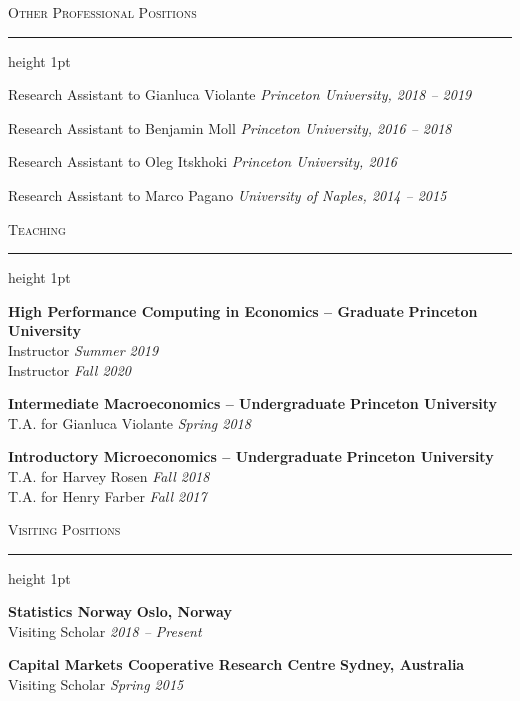 \documentclass{resume} %
\renewenvironment{rSection}[1]{
\sectionskip
\Large{\textsc{#1}}
\normalsize
\sectionlineskip
\hrule height 1pt
\begin{list}{}{
\setlength{\leftmargin}{1.5em}
}
\item[]
}{
\end{list}
}
\begin{document}

\begin{rSection}{Other Professional Positions}

{Research Assistant to Gianluca Violante} \hfill {\em Princeton University, 2018 -- 2019}

{Research Assistant to Benjamin Moll} \hfill {\em Princeton University, 2016 -- 2018}

{Research Assistant to Oleg Itskhoki} \hfill {\em Princeton University, 2016}

{Research Assistant to Marco Pagano} \hfill {\em University of Naples, 2014 -- 2015}

\end{rSection}


\begin{rSection}{Teaching}

{\bf High Performance Computing in Economics -- Graduate} \hfill {\bf Princeton University} \\
{Instructor} \hfill {\em Summer 2019} \\
{Instructor} \hfill {\em Fall 2020}

{\bf Intermediate Macroeconomics -- Undergraduate} \hfill {\bf Princeton University} \\
{T.A. for Gianluca Violante} \hfill {\em Spring 2018} 

{\bf Introductory Microeconomics -- Undergraduate} \hfill {\bf Princeton University} \\
{T.A. for Harvey Rosen} \hfill {\em Fall 2018} \\
{T.A. for Henry Farber} \hfill {\em Fall 2017} 

\end{rSection}


\begin{rSection}{Visiting Positions}

{\bf Statistics Norway} \hfill {\bf Oslo, Norway}
\\ Visiting Scholar \hfill {\em 2018 -- Present}

{\bf Capital Markets Cooperative Research Centre} \hfill {\bf Sydney, Australia}
\\ Visiting Scholar \hfill {\em Spring 2015}


\end{rSection}
\end{document}
